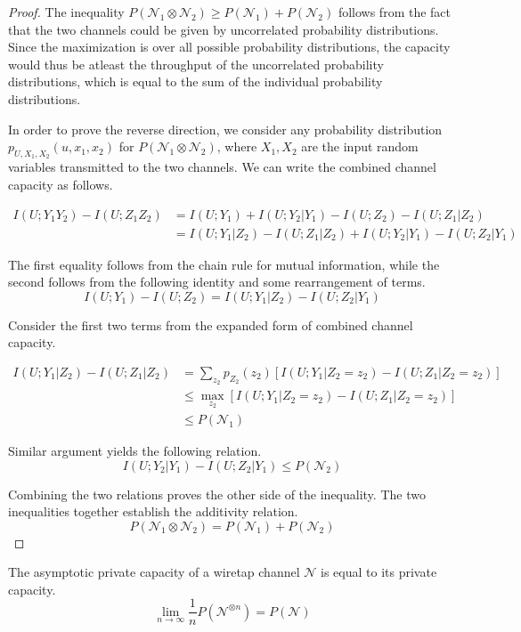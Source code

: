 \begin{proof}
The inequality $P(\mathcal{N}_1 \otimes \mathcal{N}_2) \geq P(\mathcal{N}_1) + P(\mathcal{N}_2)$ follows from the fact that the two channels could be given by uncorrelated probability distributions. Since the maximization is over all possible probability distributions, the capacity would thus be atleast the throughput of the uncorrelated probability distributions, which is equal to the sum of the individual probability distributions.

In order to prove the reverse direction, we consider any probability distribution $p_{U, X_1, X_2}(u, x_1, x_2)$ for $P(\mathcal{N}_1 \otimes \mathcal{N}_2)$, where $X_1, X_2$ are the input random variables transmitted to the two channels. We can write the combined channel capacity as follows.

\begin{align*}
I(U; Y_1 Y_2) - I(U; Z_1 Z_2) &= I(U; Y_1) + I(U; Y_2 | Y_1) - I(U; Z_2) - I(U; Z_1 | Z_2) \\
&= I(U; Y_1 | Z_2) - I(U; Z_1 | Z_2) + I(U; Y_2 | Y_1) - I(U; Z_2 | Y_1)
\end{align*}

The first equality follows from the chain rule for mutual information, while the second follows from the following identity and some rearrangement of terms.
$$I(U; Y_1) - I(U; Z_2) = I(U; Y_1 | Z_2) - I(U; Z_2 | Y_1)$$

Consider the first two terms from the expanded form of combined channel capacity.

\begin{align*}
I(U; Y_1 | Z_2) - I(U; Z_1 | Z_2) &= \sum_{z_2} p_{Z_2}(z_2) [I(U; Y_1 | Z_2 = z_2) - I(U; Z_1 | Z_2 = z_2)] \\
&\leq \max_{z_2} [I(U; Y_1 | Z_2 = z_2) - I(U; Z_1 | Z_2 = z_2)] \\
&\leq P(\mathcal{N}_1)
\end{align*}

Similar argument yields the following relation.
$$I(U; Y_2 | Y_1) - I(U; Z_2 | Y_1) \leq P(\mathcal{N}_2)$$

Combining the two relations proves the other side of the inequality. The two inequalities together establish the additivity relation.
$$P(\mathcal{N}_1 \otimes \mathcal{N}_2) = P(\mathcal{N}_1) + P(\mathcal{N}_2)$$
\end{proof}

\begin{theorem}
The asymptotic private capacity of a wiretap channel $\mathcal{N}$ is equal to its private capacity.
$$\lim_{n \rightarrow \infty} \frac{1}{n} P(\mathcal{N}^{\otimes n}) = P(\mathcal{N})$$
\end{theorem}

